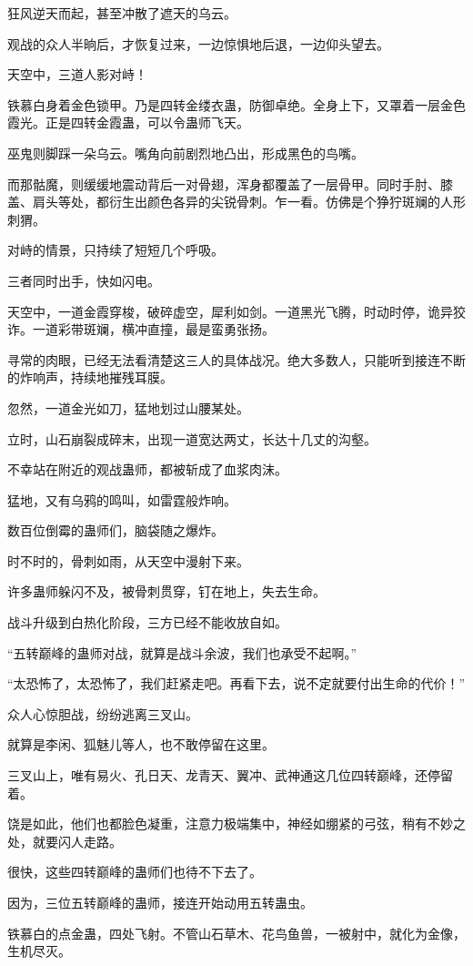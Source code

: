 \begin{this_body}
狂风逆天而起，甚至冲散了遮天的乌云。

观战的众人半晌后，才恢复过来，一边惊惧地后退，一边仰头望去。

天空中，三道人影对峙！

铁慕白身着金色锁甲。乃是四转金缕衣蛊，防御卓绝。全身上下，又罩着一层金色霞光。正是四转金霞蛊，可以令蛊师飞天。

巫鬼则脚踩一朵乌云。嘴角向前剧烈地凸出，形成黑色的鸟嘴。

而那骷魔，则缓缓地震动背后一对骨翅，浑身都覆盖了一层骨甲。同时手肘、膝盖、肩头等处，都衍生出颜色各异的尖锐骨刺。乍一看。仿佛是个狰狞斑斓的人形刺猬。

对峙的情景，只持续了短短几个呼吸。

三者同时出手，快如闪电。

天空中，一道金霞穿梭，破碎虚空，犀利如剑。一道黑光飞腾，时动时停，诡异狡诈。一道彩带斑斓，横冲直撞，最是蛮勇张扬。

寻常的肉眼，已经无法看清楚这三人的具体战况。绝大多数人，只能听到接连不断的炸响声，持续地摧残耳膜。

忽然，一道金光如刀，猛地划过山腰某处。

立时，山石崩裂成碎末，出现一道宽达两丈，长达十几丈的沟壑。

不幸站在附近的观战蛊师，都被斩成了血浆肉沫。

猛地，又有乌鸦的鸣叫，如雷霆般炸响。

数百位倒霉的蛊师们，脑袋随之爆炸。

时不时的，骨刺如雨，从天空中漫射下来。

许多蛊师躲闪不及，被骨刺贯穿，钉在地上，失去生命。

战斗升级到白热化阶段，三方已经不能收放自如。

“五转巅峰的蛊师对战，就算是战斗余波，我们也承受不起啊。”

“太恐怖了，太恐怖了，我们赶紧走吧。再看下去，说不定就要付出生命的代价！”

众人心惊胆战，纷纷逃离三叉山。

就算是李闲、狐魅儿等人，也不敢停留在这里。

三叉山上，唯有易火、孔日天、龙青天、翼冲、武神通这几位四转巅峰，还停留着。

饶是如此，他们也都脸色凝重，注意力极端集中，神经如绷紧的弓弦，稍有不妙之处，就要闪人走路。

很快，这些四转巅峰的蛊师们也待不下去了。

因为，三位五转巅峰的蛊师，接连开始动用五转蛊虫。

铁慕白的点金蛊，四处飞射。不管山石草木、花鸟鱼兽，一被射中，就化为金像，生机尽灭。


\end{this_body}

